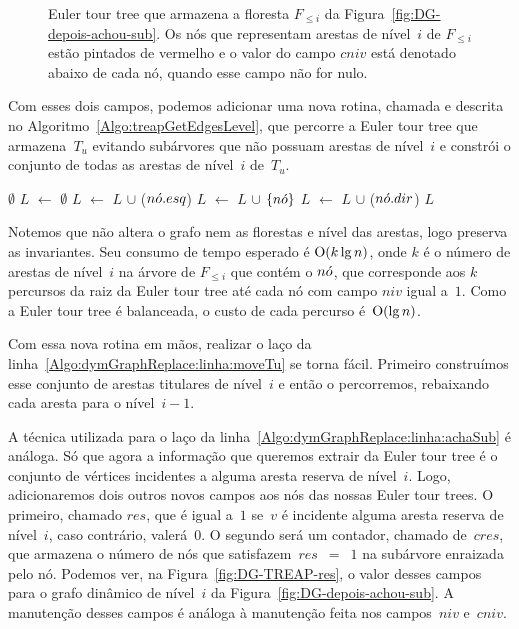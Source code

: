 \begin{figure}[htb]
\scalebox{.61}{
\centering
}
\caption{Euler tour tree que armazena a floresta $F_{\leqslant i}$ da Figura~\ref{fig:DG-depois-achou-sub}. Os nós que representam arestas de nível~$i$ de $F_{\leqslant i}$ estão pintados de vermelho e o valor do campo $cniv$ está denotado abaixo de cada nó, quando esse campo não for nulo.}
\label{fig:DG-TREAP-niv}
\end{figure}

Com esses dois campos, podemos adicionar uma nova rotina, chamada \treapGetEdgesLevel{} e descrita no Algoritmo~\ref{Algo:treapGetEdgesLevel}, que percorre a Euler tour tree que armazena~$T_u$ evitando subárvores que não possuam arestas de nível~$i$ e constrói o conjunto de todas as arestas de nível~$i$ de~$T_u$.

\begin{algorithm}
\caption{\treapGetEdgesLevel($\node$)}
\label{Algo:treapGetEdgesLevel}
\begin{algorithmic}[1]
\State \Return $\emptyset$
\EndIf
\State $L$ $\gets$ $\emptyset$
\State  $L$ $\gets$ $L$ $\cup$ \treapGetEdgesLevel($n\acute{o}.esq$)
\EndIf
{}
\State $L$ $\gets$ $L$ $\cup$ $\{n\acute{o}\}$
\EndIf
{}
\State  $L$ $\gets$ $L$ $\cup$ \treapGetEdgesLevel($n\acute{o}.dir$)
\EndIf
\State \Return $L$
\end{algorithmic}
\end{algorithm}

Notemos que \treapGetEdgesLevel{} não altera o grafo nem as florestas e nível das arestas, logo preserva as invariantes. Seu consumo de tempo esperado é $\mathrm{O}(k \lg n)$, onde $k$ é o número de arestas de nível~$i$ na árvore de $F_{\leqslant i}$ que contém o $\node$, que corresponde aos $k$ percursos da raiz da Euler tour tree até cada nó com campo $niv$ igual a~$1$. Como a Euler tour tree é balanceada, o custo de cada percurso é~$\mathrm{O}(\lg n)$.

Com essa nova rotina em mãos, realizar o laço da linha~\ref{Algo:dymGraphReplace:linha:moveTu} se torna fácil. Primeiro construímos esse conjunto de arestas titulares de nível~$i$ e então o percorremos, rebaixando cada aresta para o nível~$i-1$.

A técnica utilizada para o laço da linha~\ref{Algo:dymGraphReplace:linha:achaSub} é análoga.
Só que agora a informação que queremos extrair da Euler tour tree é o conjunto de vértices incidentes a alguma aresta reserva de nível~$i$.
Logo, adicionaremos dois outros novos campos aos nós das nossas Euler tour trees.
O primeiro, chamado $res$, que é igual a~$1$ se~$v$ é incidente alguma aresta reserva de nível~$i$, caso contrário, valerá~$0$.
O segundo será um contador, chamado de~$cres$, que armazena o número de nós que satisfazem~$res$~$=$~$1$ na subárvore enraizada pelo nó.
Podemos ver, na Figura~\ref{fig:DG-TREAP-res}, o valor desses campos para o grafo dinâmico de nível~$i$ da Figura~\ref{fig:DG-depois-achou-sub}.
A manutenção desses campos é análoga à manutenção feita nos campos~$niv$ e~$cniv$.


